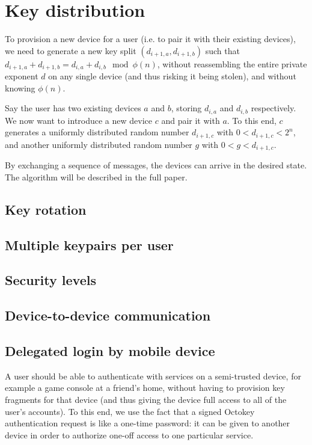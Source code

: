 \section{Key distribution}

To provision a new device for a user (i.e. to pair it with their existing devices), we need to
generate a new key split $(d_{i+1,a}, d_{i+1,b})$ such that
$d_{i+1,a} + d_{i+1,b} = d_{i,a} + d_{i,b} \mod \phi(n)$, without reassembling the entire private
exponent $d$ on any single device (and thus risking it being stolen), and without knowing $\phi(n)$.

Say the user has two existing devices $a$ and $b$, storing $d_{i,a}$ and $d_{i,b}$ respectively. We
now want to introduce a new device $c$ and pair it with $a$. To this end, $c$ generates a uniformly
distributed random number $d_{i+1,c}$ with $0 < d_{i+1,c} < 2^n$, and another uniformly distributed
random number $g$ with $0 < g < d_{i+1,c}$.

By exchanging a sequence of messages, the devices can arrive in the desired state. The algorithm
will be described in the full paper.

\subsection{Key rotation}
\subsection{Multiple keypairs per user}
\subsection{Security levels}
\subsection{Device-to-device communication}


\subsection{Delegated login by mobile device}\label{sec:delegation}

A user should be able to authenticate with services on a semi-trusted device, for example a game
console at a friend's home, without having to provision key fragments for that device (and thus
giving the device full access to all of the user's accounts). To this end, we use the fact that a
signed Octokey authentication request is like a one-time password: it can be given to another device
in order to authorize one-off access to one particular service.


